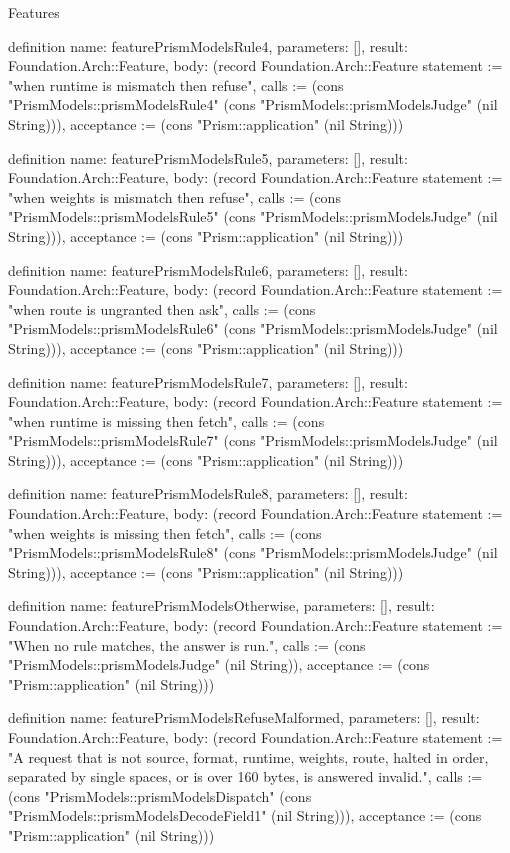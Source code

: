 \begin{lexlean}{Features}
\begin{semanticmodule}
definition{
  name: featurePrismModelsRule4,
  parameters: [],
  result: Foundation.Arch::Feature,
  body: (record Foundation.Arch::Feature {statement := "when runtime is mismatch then refuse", calls := (cons "PrismModels::prismModelsRule4" (cons "PrismModels::prismModelsJudge" (nil String))), acceptance := (cons "Prism::application" (nil String))})
}

definition{
  name: featurePrismModelsRule5,
  parameters: [],
  result: Foundation.Arch::Feature,
  body: (record Foundation.Arch::Feature {statement := "when weights is mismatch then refuse", calls := (cons "PrismModels::prismModelsRule5" (cons "PrismModels::prismModelsJudge" (nil String))), acceptance := (cons "Prism::application" (nil String))})
}

definition{
  name: featurePrismModelsRule6,
  parameters: [],
  result: Foundation.Arch::Feature,
  body: (record Foundation.Arch::Feature {statement := "when route is ungranted then ask", calls := (cons "PrismModels::prismModelsRule6" (cons "PrismModels::prismModelsJudge" (nil String))), acceptance := (cons "Prism::application" (nil String))})
}

definition{
  name: featurePrismModelsRule7,
  parameters: [],
  result: Foundation.Arch::Feature,
  body: (record Foundation.Arch::Feature {statement := "when runtime is missing then fetch", calls := (cons "PrismModels::prismModelsRule7" (cons "PrismModels::prismModelsJudge" (nil String))), acceptance := (cons "Prism::application" (nil String))})
}

definition{
  name: featurePrismModelsRule8,
  parameters: [],
  result: Foundation.Arch::Feature,
  body: (record Foundation.Arch::Feature {statement := "when weights is missing then fetch", calls := (cons "PrismModels::prismModelsRule8" (cons "PrismModels::prismModelsJudge" (nil String))), acceptance := (cons "Prism::application" (nil String))})
}

definition{
  name: featurePrismModelsOtherwise,
  parameters: [],
  result: Foundation.Arch::Feature,
  body: (record Foundation.Arch::Feature {statement := "When no rule matches, the answer is run.", calls := (cons "PrismModels::prismModelsJudge" (nil String)), acceptance := (cons "Prism::application" (nil String))})
}

definition{
  name: featurePrismModelsRefuseMalformed,
  parameters: [],
  result: Foundation.Arch::Feature,
  body: (record Foundation.Arch::Feature {statement := "A request that is not source, format, runtime, weights, route, halted in order, separated by single spaces, or is over 160 bytes, is answered invalid.", calls := (cons "PrismModels::prismModelsDispatch" (cons "PrismModels::prismModelsDecodeField1" (nil String))), acceptance := (cons "Prism::application" (nil String))})
}


\end{semanticmodule}
\end{lexlean}
